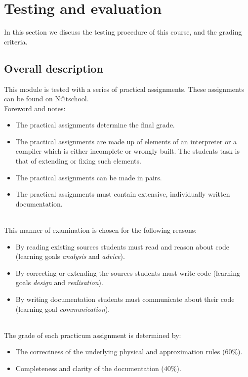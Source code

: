 \section{Testing and evaluation}
	In this section we discuss the testing procedure of this course, and the grading criteria.
	
	\subsection{Overall description}
		
		This module is tested with a series of practical assignments. These assignments can be found on N@tschool. \\

		Foreword and notes:
		\begin{itemize}
			\item The practical assignments determine the final grade.
			\item The practical assignments are made up of elements of an interpreter or a compiler which is either incomplete or wrongly built. The students task is that of extending or fixing such elements.
			\item The practical assignments can be made in pairs.
			\item The practical assignments must contain extensive, individually written documentation.
		\end{itemize}
		\ \\
		
		This manner of examination is chosen for the following reasons:
		\begin{itemize}
			\item By reading existing sources students must read and reason about code (learning goals \textit{analysis} and \textit{advice}).
			\item By correcting or extending the sources students must write code (learning goals \textit{design} and \textit{realisation}).
			\item By writing documentation students must communicate about their code (learning goal \textit{communication}).
		\end{itemize}

		\ \\
		The grade of each practicum assignment is determined by:
		\begin{itemize}
			\item The correctness of the underlying physical and approximation rules (60\%).
			\item Completeness and clarity of the documentation (40\%).
		\end{itemize}

